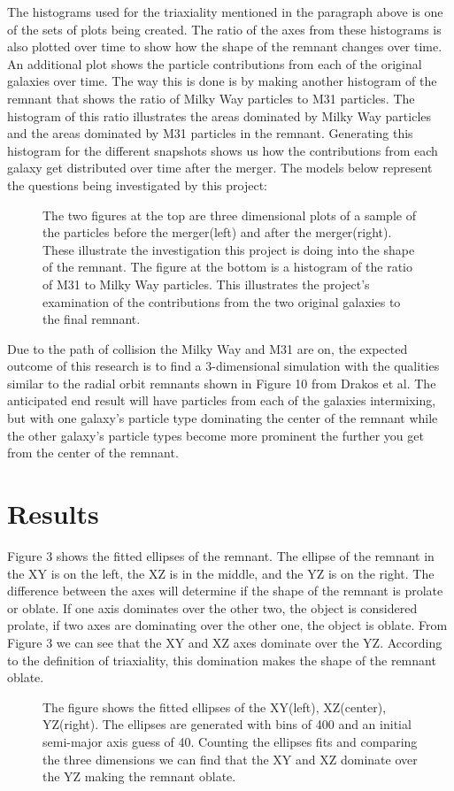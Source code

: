 \documentclass[linenumbers,trackchanges]{aastex7}
\begin{document}
The histograms used for the triaxiality mentioned in the paragraph above is one of the sets of plots being created. The ratio of the axes from these histograms is also plotted over time to show how the shape of the remnant changes over time. An additional plot shows the particle contributions from each of the original galaxies over time. The way this is done is by making another histogram of the remnant that shows the ratio of Milky Way particles to M31 particles. The histogram of this ratio illustrates the areas dominated by Milky Way particles and the areas dominated by M31 particles in the remnant. Generating this histogram for the different snapshots shows us how the contributions from each galaxy get distributed over time after the merger. 
The models below represent the questions being investigated by this project:
\begin{figure}[ht!]
\caption{The two figures at the top are three dimensional plots of a sample of the particles before the merger(left) and after the merger(right). These illustrate the investigation this project is doing into the shape of the remnant. The figure at the bottom is a histogram of the ratio of M31 to Milky Way particles. This illustrates the project's examination of the contributions from the two original galaxies to the final remnant.
\label{fig:general}}
\end{figure}

Due to the path of collision the Milky Way and M31 are on, the expected outcome of this research is to find a 3-dimensional simulation with the qualities similar to the radial orbit remnants shown in Figure 10 from Drakos et al. The anticipated end result will have particles from each of the galaxies intermixing, but with one galaxy’s particle type dominating the center of the remnant while the other galaxy's particle types become more prominent the further you get from the center of the remnant. 

\section{Results} \label{sec:style}
Figure 3 shows the fitted ellipses of the remnant. The ellipse of the remnant in the XY is on the left, the XZ is in the middle, and the YZ is on the right. The difference between the axes will determine if the shape of the remnant is prolate or oblate. If one axis dominates over the other two, the object is considered prolate, if two axes are dominating over the other one, the object is oblate.\cite{2019MNRAS.487..993D} From Figure 3 we can see that the XY and XZ axes dominate over the YZ. According to the definition of triaxiality, this domination makes the shape of the remnant oblate.
\begin{figure}[ht!]
\caption{The figure shows the fitted ellipses of the XY(left), XZ(center), YZ(right). The ellipses are generated with bins of 400 and an initial semi-major axis guess of 40. Counting the ellipses fits and comparing the three dimensions we can find that the XY and XZ dominate over the YZ making the remnant oblate. 
\label{fig:general}}
\end{figure}
\end{document}
